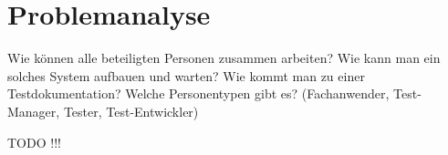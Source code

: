 ﻿\chapter{Problemanalyse}
\label{cha:Problemanalyse}

Wie können alle beteiligten Personen zusammen arbeiten?
Wie kann man ein solches System aufbauen und warten?
Wie kommt man zu einer Testdokumentation?
Welche Personentypen gibt es? (Fachanwender, Test-Manager, Tester, Test-Entwickler)

TODO !!!
